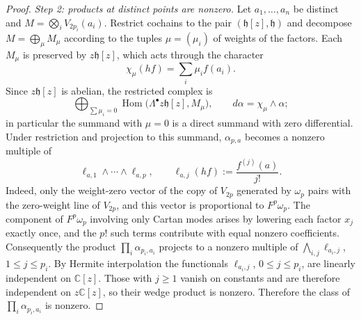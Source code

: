 \documentclass[11pt]{amsart}
\numberwithin{equation}{section}
\theoremstyle{definition}
\theoremstyle{remark}
\newcommand{\C}{\mathbb{C}}
\newcommand{\hh}{\mathfrak{h}}
\newcommand{\Hom}{\operatorname{Hom}}
\begin{document}
\begin{proof}
\emph{Step 2: products at distinct points are nonzero.} Let $a_1,\dots,a_n$ be distinct and $M=\bigotimes_iV_{2p_i}(a_i)$. Restrict cochains to the pair $(\hh[z],\hh)$ and decompose $M=\bigoplus_\mu M_\mu$ according to the tuples $\mu=(\mu_i)$ of weights of the factors. Each $M_\mu$ is preserved by $z\hh[z]$, which acts through the character
\begin{equation}\label{eq:character}
\chi_\mu(hf)=\sum_i\mu_if(a_i).
\end{equation}
Since $z\hh[z]$ is abelian, the restricted complex is
\begin{equation}\label{eq:restricted-complex}
\bigoplus_{\sum\mu_i=0}\Hom\bigl(\Lambda^\bullet z\hh[z],M_\mu\bigr),\qquad d\alpha=\chi_\mu\wedge\alpha;
\end{equation}
in particular the summand with $\mu=0$ is a direct summand with zero differential. Under restriction and projection to this summand, $\alpha_{p,a}$ becomes a nonzero multiple of
\begin{equation}\label{eq:ell}
\ell_{a,1}\wedge\cdots\wedge\ell_{a,p},\qquad \ell_{a,j}(hf):=\frac{f^{(j)}(a)}{j!}.
\end{equation}
Indeed, only the weight-zero vector of the copy of $V_{2p}$ generated by $\omega_p$ pairs with the zero-weight line of $V_{2p}$, and this vector is proportional to $F^p\omega_p$. The component of $F^p\omega_p$ involving only Cartan modes arises by lowering each factor $x_j$ exactly once, and the $p!$ such terms contribute with equal nonzero coefficients. Consequently the product $\prod_i\alpha_{p_i,a_i}$ projects to a nonzero multiple of $\bigwedge_{i,j}\ell_{a_i,j}$, $1\le j\le p_i$. By Hermite interpolation the functionals $\ell_{a_i,j}$, $0\le j\le p_i$, are linearly independent on $\C[z]$. Those with $j\ge1$ vanish on constants and are therefore independent on $z\C[z]$, so their wedge product is nonzero. Therefore the class of $\prod_i\alpha_{p_i,a_i}$ is nonzero.


\end{proof}
\end{document}
